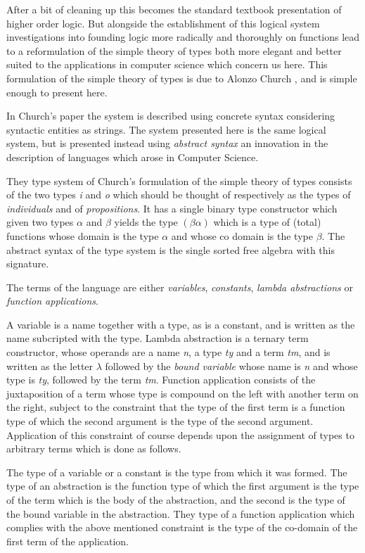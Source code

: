 \documentclass[10pt,titlepage]{book}
\begin{document}
After a bit of cleaning up this becomes the standard textbook presentation of higher order logic.
But alongside the establishment of this logical system investigations into founding logic more radically and thoroughly on functions lead to a reformulation of the simple theory of types both more elegant and better suited to the applications in computer science which concern us here.
This formulation of the simple theory of types is due to Alonzo Church \cite{church40}, and is simple enough to present here.

In Church's paper the system is described using concrete syntax considering syntactic entities as strings.
The system presented here is the same logical system, but is presented instead using {\it abstract syntax} an innovation in the description of languages which arose in Computer Science.

They type system of Church's formulation of the simple theory of types consists of the two types {\it i} and {\it o} which should be thought of respectively as the types of {\it individuals} and of {\it propositions}.
It has a single binary type constructor which given two types ${\alpha}$ and ${\beta}$ yields the type $(\beta\alpha)$ which is a type of (total) functions whose domain is the type $\alpha$ and whose co domain is the type $\beta$.
The abstract syntax of the type system is the single sorted free algebra with this signature.

The terms of the language are either {\it variables}, {\it constants}, {\it lambda abstractions} or {\it function applications}.

A variable is a name together with a type, as is a constant, and is written as the name subcripted with the type.
Lambda abstraction is a ternary term constructor, whose operands are a name {\it n}, a type {\it ty} and a term {\it tm}, and is written as the letter ${\lambda}$ followed by the {\it bound variable} whose name is {\it n} and whose type is {\it ty}, followed by the term {\it tm}.
Function application consists of the juxtaposition of a term whose type is compound on the left with another term on the right, subject to the constraint that the type of the first term is a function type of which the second argument is the type of the second argument.
Application of this constraint of course depends upon the assignment of types to arbitrary terms which is done as follows.

The type of a variable or a constant is the type from which it was formed.
The type of an abstraction is the function type of which the first argument is the type of the term which is the body of the abstraction, and the second is the type of the bound variable in the abstraction.
They type of a function application which complies with the above mentioned constraint is the type of the co-domain of the first term of the application.
\end{document}
